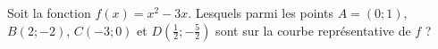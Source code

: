 
\begin{exercice}\label{exosmath-0512}

    Soit la fonction \( f(x)=x^2-3x\). Lesquels parmi les points \( A=(0;1)\), \( B(2;-2)\), \( C(-3;0)\) et \( D(\frac{ 1 }{2};-\frac{ 5 }{ 2 })\) sont sur la courbe représentative de \( f\) ?

\end{exercice}
